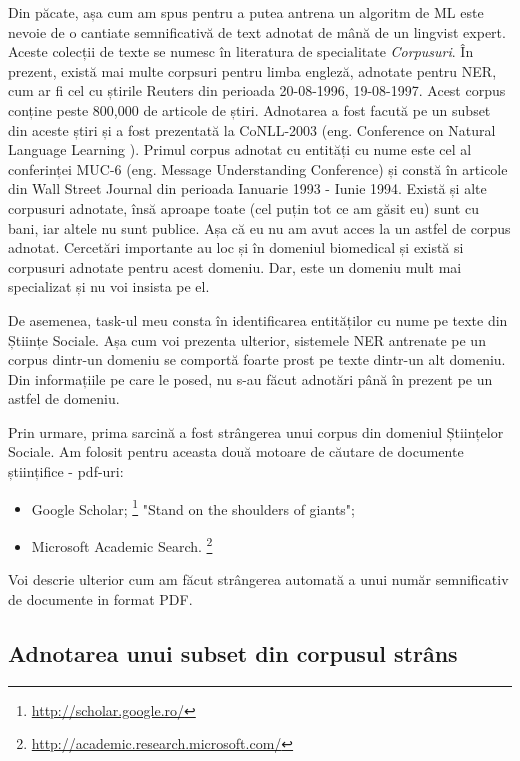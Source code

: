 Din păcate, așa cum am spus pentru a putea antrena un algoritm de ML este nevoie de o cantiate semnificativă de text adnotat de mână de un lingvist expert. Aceste colecții de texte se numesc în literatura de specialitate \textit{Corpusuri}. În prezent, există mai multe corpsuri pentru limba engleză, adnotate pentru NER, cum ar fi cel cu știrile Reuters din perioada 20-08-1996, 19-08-1997.\cite{rcv1} Acest corpus conține peste 800,000 de articole de știri. Adnotarea a fost facută pe un subset din aceste știri și a fost prezentată la CoNLL-2003\cite{conll2003} (eng. Conference on Natural Language Learning ). Primul corpus adnotat cu entități cu nume este cel al conferinței MUC-6 (eng. Message Understanding Conference) și constă în articole din Wall Street Journal din perioada Ianuarie 1993 - Iunie 1994.  Există și alte corpusuri adnotate, însă aproape toate (cel puțin tot ce am găsit eu) sunt cu bani, iar altele nu sunt publice. Așa că eu nu am avut acces la un astfel de corpus adnotat. Cercetări importante au loc și în domeniul biomedical și există si corpusuri adnotate pentru acest domeniu. Dar, este un domeniu mult mai specializat și nu voi insista pe el.

De asemenea, task-ul meu consta în identificarea entităților cu nume pe texte din Științe Sociale. Așa cum voi prezenta ulterior, sistemele NER antrenate pe un corpus dintr-un domeniu se comportă foarte prost pe texte dintr-un alt domeniu. Din informațiile pe care le posed, nu s-au făcut adnotări până în prezent pe un astfel de domeniu.

Prin urmare, prima sarcină a fost strângerea unui corpus din domeniul Științelor Sociale. Am folosit pentru aceasta două motoare de căutare de documente științifice - pdf-uri:

\begin{itemize}
\item Google Scholar; \footnote{\url{http://scholar.google.ro/}} "Stand on the shoulders of giants";
\item Microsoft Academic Search. \footnote{\url{http://academic.research.microsoft.com/}}
\end{itemize}

Voi descrie ulterior cum am făcut strângerea automată a unui număr semnificativ de documente in format PDF.

\subsection{Adnotarea unui subset din corpusul strâns}

